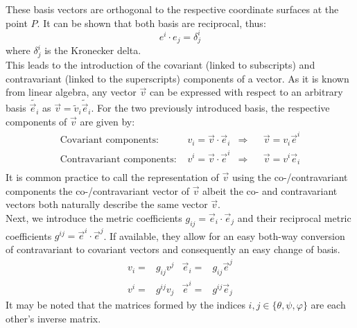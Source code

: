 These basis vectors are orthogonal to the respective coordinate surfaces at the point $P$. It can be shown that both basis are reciprocal, thus:
$$ e^i\cdot e_j = \delta^i_j $$
where $\delta^i_j$ is the Kronecker delta. \\
This leads to the introduction of the covariant (linked to subscripts) and contravariant (linked to the superscripts) components of a vector. As it is known from linear algebra, any vector $\vec{v}$ can be expressed with respect to an arbitrary basis $\tilde{\vec{e}_i}$ as $\vec{v}=\tilde{v}_i\tilde{\vec{e}}_i$. For the two previously introduced basis, the respective components of $\vec{v}$ are given by: 
\begin{align*}
	\text{Covariant components: }    & v_i = \vec{v}\cdot\vec{e}_i & \Rightarrow && \vec{v} = v_i\vec{e}^i \\
	\text{Contravariant components: }& v^i = \vec{v}\cdot\vec{e}^i & \Rightarrow && \vec{v} = v^i\vec{e}_i \\
\end{align*}
It is common practice to call the representation of $\vec{v}$ using the co-/contravariant components the co-/contravariant vector of $\vec{v}$ albeit the co- and contravariant vectors both naturally describe the same vector $\vec{v}$. \\
Next, we introduce the metric coefficients $g_{ij} = \vec{e}_i\cdot \vec{e}_j$ and their reciprocal metric coefficients $g^{ij} = \vec{e}^i\cdot \vec{e}^j$. If available, they allow for an easy both-way conversion of contravariant to covariant vectors and consequently an easy change of basis. 
\begin{align*}
	v_i =& g_{ij}v^j & \vec{e}_i =& g_{ij}\vec{e}^j \\
	v^i =& g^{ij}v_j & \vec{e}^i =& g^{ij}\vec{e}_j 
\end{align*}
It may be noted that the matrices formed by the indices $i,j\in\{\theta,\psi,\varphi\}$ are each other's inverse matrix. \\



